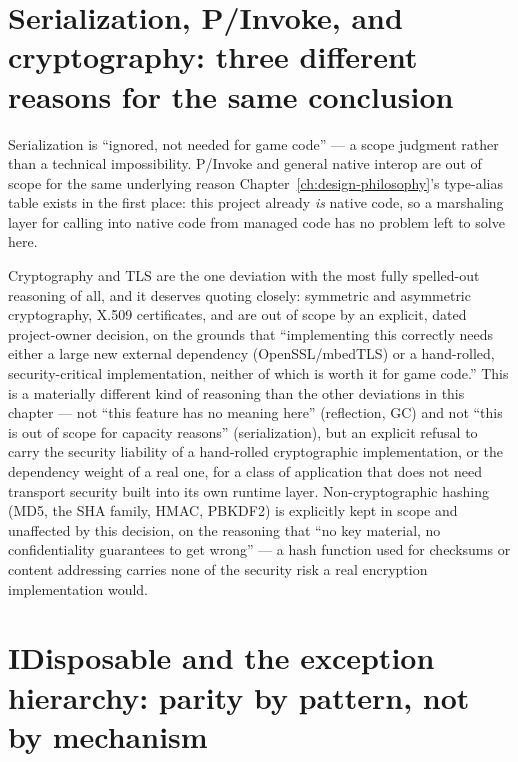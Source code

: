 \section{Serialization, P/Invoke, and cryptography: three different reasons for the same conclusion}

Serialization is ``ignored, not needed for game code'' --- a scope judgment rather than a
technical impossibility. P/Invoke and general native interop are out of scope for the same
underlying reason Chapter~\ref{ch:design-philosophy}'s type-alias table exists in the first
place: this project already \emph{is} native code, so a marshaling layer for calling into
native code from managed code has no problem left to solve here.

Cryptography and TLS are the one deviation with the most fully spelled-out reasoning of all,
and it deserves quoting closely: symmetric and asymmetric cryptography, X.509 certificates,
and  are out of scope by an explicit, dated project-owner decision, on the
grounds that ``implementing this correctly needs either a large new external dependency
(OpenSSL/mbedTLS) or a hand-rolled, security-critical implementation, neither of which is
worth it for game code.'' This is a materially different kind of reasoning than the other
deviations in this chapter --- not ``this feature has no meaning here'' (reflection, GC) and
not ``this is out of scope for capacity reasons'' (serialization), but an explicit refusal to
carry the security liability of a hand-rolled cryptographic implementation, or the dependency
weight of a real one, for a class of application that does not need transport security built
into its own runtime layer. Non-cryptographic hashing (MD5, the SHA family, HMAC, PBKDF2) is
explicitly kept in scope and unaffected by this decision, on the reasoning that ``no key
material, no confidentiality guarantees to get wrong'' --- a hash function used for checksums
or content addressing carries none of the security risk a real encryption implementation
would.

\section{IDisposable and the exception hierarchy: parity by pattern, not by mechanism}

